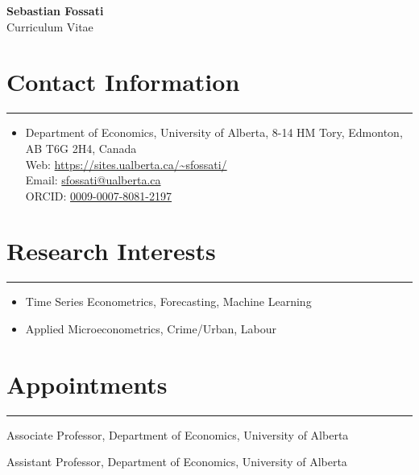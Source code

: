 \documentclass[overlapped,letterpaper,11pt]{res}
\newcommand{\cvrule}{%
  \hspace*{-\sectionwidth}%
  \rule[2mm]{\dimexpr\textwidth+\sectionwidth\relax}{.25pt}}
\newcommand{\cvsection}[1]{%
  \needspace{4\baselineskip}%
  \section{\textbf{#1}}%
  \cvrule}
\begin{document}

\setlength{\leftmargini}{.5cm}
\renewcommand{\labelitemi}{}


\begin{flushright}
{\LARGE\bfseries Sebastian Fossati} \\
Curriculum Vitae
\end{flushright}

\begin{resume}
\vspace*{-.25in}


\cvsection{Contact Information}
\begin{itemize}
\item Department of Economics, University of Alberta, 8-14 HM Tory,
	Edmonton, AB T6G 2H4, Canada \\
	Web: \url{https://sites.ualberta.ca/~sfossati/} \\
	Email: \href{mailto:sfossati@ualberta.ca}{sfossati@ualberta.ca} \\
	ORCID: \href{https://orcid.org/0009-0007-8081-2197}{0009-0007-8081-2197}
\end{itemize}


\cvsection{Research Interests}
\begin{itemize}
\item Time Series Econometrics, Forecasting, Machine Learning
\item Applied Microeconometrics, Crime/Urban, Labour
\end{itemize}


\cvsection{Appointments}
\begin{mylist}
\item [2017--\phantom{17}] Associate Professor, Department of Economics, University of Alberta
\item [2010--17] Assistant Professor, Department of Economics, University of Alberta
\end{mylist}



\end{resume}
\end{document}
